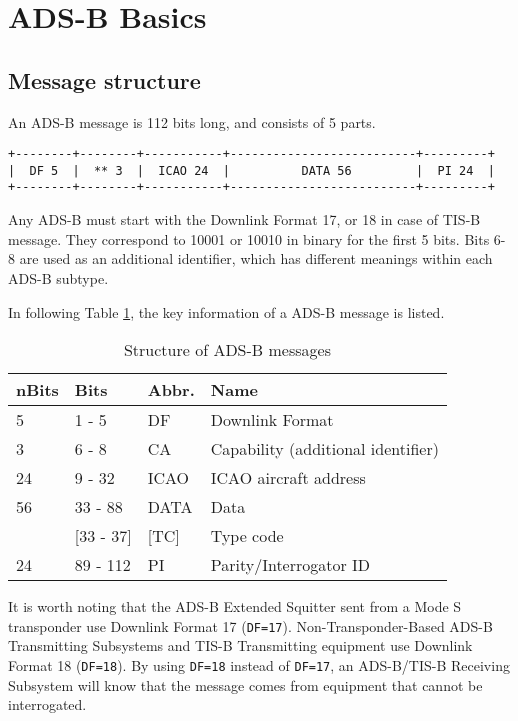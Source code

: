\section{ADS-B Basics}\label{introduction}

\subsection{Message structure}\label{message-structure}

An ADS-B message is 112 bits long, and consists of 5 parts.

\begin{verbatim}
+--------+--------+-----------+--------------------------+---------+
|  DF 5  |  ** 3  |  ICAO 24  |          DATA 56         |  PI 24  |
+--------+--------+-----------+--------------------------+---------+
\end{verbatim}

Any ADS-B must start with the Downlink Format 17, or 18 in case of TIS-B message. They correspond to 10001 or 10010 in binary for the first 5 bits. Bits 6-8 are used as an additional identifier, which has different meanings within each ADS-B subtype.

In following Table \ref{tb:adsb-structure}, the key information of a ADS-B message is listed.

\begin{table}[!ht]
\centering
\caption{Structure of ADS-B messages}
\label{tb:adsb-structure}
\begin{tabular}{@{}llll@{}}
\toprule
nBits & Bits & Abbr. & Name \\ \midrule
5 & 1 - 5 & DF & Downlink Format \\
3 & 6 - 8 & CA & Capability (additional identifier) \\
24 & 9 - 32 & ICAO & ICAO aircraft address \\
56 & 33 - 88 & DATA & Data \\
 & {[}33 - 37{]} & {[}TC{]} & Type code \\
24 & 89 - 112 & PI & Parity/Interrogator ID \\ \bottomrule
\end{tabular}
\end{table}

It is worth noting that the ADS-B Extended Squitter sent from a Mode S transponder use Downlink Format 17 (\texttt{DF=17}). Non-Transponder-Based ADS-B Transmitting Subsystems and TIS-B Transmitting equipment use Downlink Format 18 (\texttt{DF=18}). By using \texttt{DF=18} instead of \texttt{DF=17}, an ADS-B/TIS-B Receiving Subsystem will know that the message comes from equipment that cannot be interrogated.

